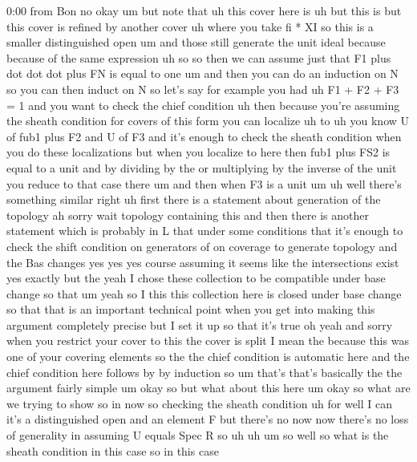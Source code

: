 \begin{unfinished}{0:00}
from
Bon
no  okay  um  but  note  that  uh  this  cover
here  is  uh  but  this  is  but  this
cover  is  refined  by  another
cover  uh  where  you  take  fi  *
XI  so  this  is  a  smaller  distinguished
open
um  and  those  still  generate  the  unit
ideal  because  because  of  the  same
expression  uh  so  so  then  we  can
assume  just  that  F1  plus  dot  dot  dot
plus  FN  is  equal  to
one  um  and  then  you  can  do  an  induction
on  N  so  you  can  then  induct  on
N  so  let's  say  for  example  you  had  uh  F1
+  F2  +  F3  =  1  and  you  want  to  check  the
chief  condition  uh  then  because  you're
assuming  the  sheath  condition  for  covers
of  this  form  you  can
localize  uh  to  uh  you  know  U  of  fub1
plus  F2  and  U  of  F3  and  it's  enough  to
check  the  sheath  condition  when  you  do
these
localizations  but  when  you  localize  to
here  then  fub1  plus  FS2  is  equal  to  a
unit  and  by  dividing  by  the  or
multiplying  by  the  inverse  of  the  unit
you  reduce  to  that  case  there  um  and
then  when  F3  is  a  unit
um  uh  well  there's  something  similar
right
uh  first  there  is  a  statement  about
generation  of  the  topology  ah  sorry  wait
topology  containing  this  and  then  there
is  another  statement  which  is  probably
in  L  that  under  some  conditions  that
it's  enough  to  check  the  shift  condition
on  generators  of  on  coverage  to  generate
topology  and  the  Bas  changes  yes  yes  yes
course  assuming  it  seems  like  the
intersections  exist  yes  exactly  but  the
yeah  I  chose  these  collection  to  be
compatible  under  base  change  so  that  um
yeah
so  I  this  this  collection  here  is  closed
under  base  change  so  that  that  is  an
important  technical  point  when  you  get
into  making  this  argument  completely
precise  but  I  set  it  up  so  that  it's
true  oh  yeah  and  sorry  when  you  restrict
your  cover  to  this  the  cover  is  split  I
mean  the  because  this  was  one  of  your
covering  elements  so  the  the  chief
condition  is  automatic  here  and  the
chief  condition  here  follows  by  by
induction  so  um  that's  that's  basically
the  the  argument  fairly
simple
um  okay  so  but  what  about  this  here
um  okay  so  what  are  we  trying  to  show  so
in  now  so  checking  the  sheath
condition  uh  for  well  I  can  it's  a
distinguished  open  and  an  element  F  but
there's  no  now  now  there's  no  loss  of
generality  in  assuming  U  equals  Spec  R
so
uh
uh
um  so  well  so  what  is  the  sheath
condition  in  this  case  so  in  this  case

\end{unfinished}
